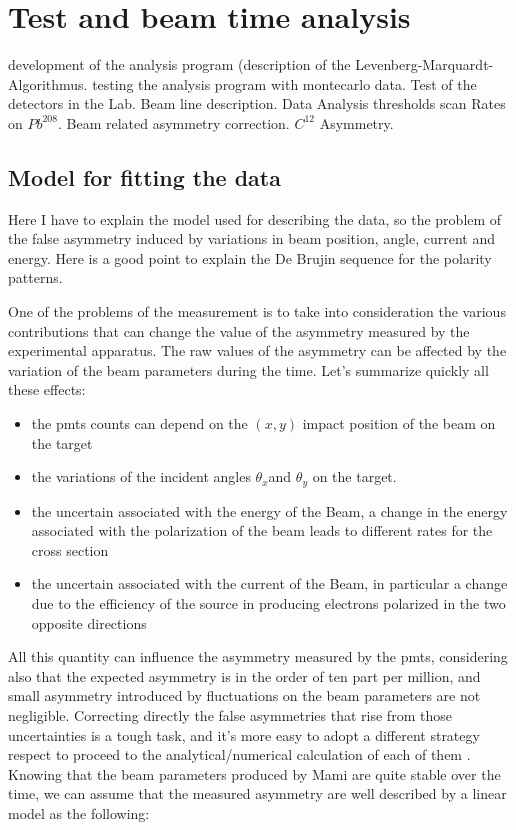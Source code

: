 \chapter{Test and beam time analysis} \label{analysis}

\begin{outline}[enumerate]
\1 development of the analysis program (description of the Levenberg-Marquardt-Algorithmus.
\1 testing the analysis program with montecarlo data.
\1 Test of the detectors in the Lab.
\1 Beam line description.
\1 Data Analysis
	\2 thresholds scan
	\2 Rates on $Pb^{208}$.
	\2 Beam related asymmetry correction.
	\2 $C^{12}$ Asymmetry.
\end{outline}

\section{Model for fitting the data}
Here I have to explain the model used for describing the data, so the problem of the false asymmetry induced by variations in beam position, angle, current and energy. Here is a good point to explain the De Brujin sequence for the polarity patterns. \bigskip

One of the problems of the measurement is to take into consideration the various contributions that can change the value of the asymmetry measured by the experimental apparatus. The raw values of the asymmetry can be affected by the variation of the beam parameters during the time. Let's summarize quickly all these effects:
\begin{itemize}
\item the pmts counts  can depend on the $(x,y)$ impact position of the beam on the target
\item the variations of the incident angles $\theta_{x}$and $\theta_{y}$ on the target.
\item the uncertain associated with the energy of the Beam, a change in the energy associated with the polarization of the beam leads to different rates for the cross section
\item the uncertain associated with the current of the Beam, in particular a change due to the 
efficiency of the source in producing electrons polarized in the two opposite directions
\end{itemize}

All this quantity can influence the asymmetry measured by the pmts, considering also that the expected asymmetry is in the order of ten part per million, and small asymmetry introduced by fluctuations on the beam parameters are not negligible. Correcting directly the false asymmetries that rise from those uncertainties is a tough task, and it's more easy to adopt a different strategy respect to proceed to the analytical/numerical calculation of each of them . Knowing that the beam parameters produced by Mami are quite stable over the time, we can assume that the measured asymmetry are well described by a linear model as the following:

